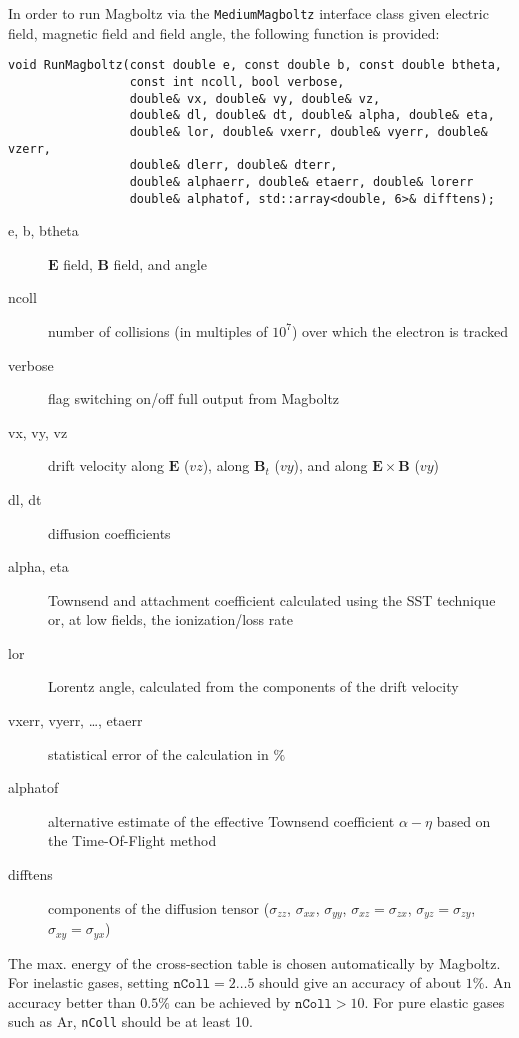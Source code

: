 In order to run Magboltz via the \texttt{MediumMagboltz} interface class
given electric field, magnetic field and field angle, the following 
function is provided:
\begin{lstlisting}
void RunMagboltz(const double e, const double b, const double btheta,
                 const int ncoll, bool verbose, 
                 double& vx, double& vy, double& vz,
                 double& dl, double& dt, double& alpha, double& eta,
                 double& lor, double& vxerr, double& vyerr, double& vzerr,
                 double& dlerr, double& dterr,
                 double& alphaerr, double& etaerr, double& lorerr 
                 double& alphatof, std::array<double, 6>& difftens);
\end{lstlisting}
\begin{description}
  \item[e, b, btheta] 
    \(\mathbf{E}\) field, \(\mathbf{B}\) field, and  angle
  \item[ncoll] 
    number of collisions (in multiples of \(10^{7}\)) over which 
    the electron is tracked
  \item[verbose] 
    flag switching on/off full output from Magboltz
  \item[vx, vy, vz] 
    drift velocity along \(\mathbf{E}\) (\(vz\)), 
    along \(\mathbf{B}_{t}\) (\(vy\)), and  
    along \(\mathbf{E} \times \mathbf{B}\) (\(vy\))
  \item[dl, dt]
    diffusion coefficients
  \item[alpha, eta]
    Townsend and attachment coefficient calculated using the
    SST technique or, at low fields, the ionization/loss rate
  \item[lor]
    Lorentz angle, calculated from the components of the drift velocity
  \item[vxerr, vyerr, \dots, etaerr] 
    statistical error of the calculation in \(\%\)
  \item[alphatof]
    alternative estimate of the effective Townsend coefficient 
    \(\alpha - \eta\) based on the Time-Of-Flight method 
  \item[difftens]
    components of the diffusion tensor ($\sigma_{zz}$, $\sigma_{xx}$, 
    $\sigma_{yy}$, $\sigma_{xz} = \sigma_{zx}$, $\sigma_{yz} = \sigma_{zy}$,
    $\sigma_{xy} = \sigma_{yx}$) 
\end{description}
The max. energy of the cross-section table  
is chosen automatically by Magboltz. 
For inelastic gases, setting \(\texttt{nColl} = 2 \dots 5\)
should give an accuracy of about \(1\%\). 
An accuracy better than \(0.5\%\) can be achieved by 
\(\texttt{nColl} > 10\). 
For pure elastic gases such as Ar, \texttt{nColl} should 
be at least 10.  

